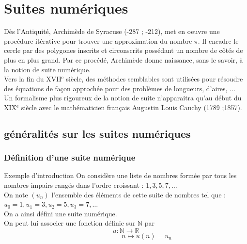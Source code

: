 \chapter{Suites numériques}
\thispagestyle{fancy}

\begin{bhistoire}
	Dès l'Antiquité, Archimède de Syracuse (-287 ; -212), met en oeuvre une procédure itérative pour trouver une approximation du nombre $\pi$. Il encadre le cercle par des polygones inscrits et circonscrits possédant un nombre de côtés de plus en plus grand. Par ce procédé,
	Archimède donne naissance, sans le savoir, à la notion de suite numérique.\\
	Vers la fin du XVII$^\text{e}$ siècle, des méthodes semblables sont utilisées pour résoudre des équations de façon approchée pour des problèmes de longueurs, d'aires, ...\\
	Un formalisme plus rigoureux de la notion de suite n'apparaitra qu'au début du XIX$^\text{e}$ siècle avec le mathématicien français Augustin Louis Cauchy (1789 ;1857).
\end{bhistoire}


\section{généralités sur les suites numériques}

\subsection{Définition d'une suite numérique}

\begin{bexemplet}{Exemple d'introduction}
	On considère une liste de nombres formée par tous les nombres impairs rangés dans l'ordre croissant : $1,3,5,7, \ldots$\\
	On note $\left(u_{n}\right)$ l'ensemble des éléments de cette suite de nombres tel que :\\
	$u_{0}=1, u_{1}=3, u_{2}=5, u_{3}=7, \ldots$\\
	On a ainsi défini une suite numérique.\\
	On peut lui associer une fonction définie sur $\mathbb{N}$ par 
	$$u: \mathbb{N} \rightarrow \mathbb{R}$$
	$$\phantom{......................}n \mapsto u(n)=u_{n}$$
	
\end{bexemplet}

\begin{bdefi}
	\begin{itemDef}
		\item {}\pointille[\textwidth-1cm]\\
		\pointille[\textwidth-1cm]
		\item {}\pointille[\textwidth-1cm]
	\end{itemDef}
\end{bdefi}

